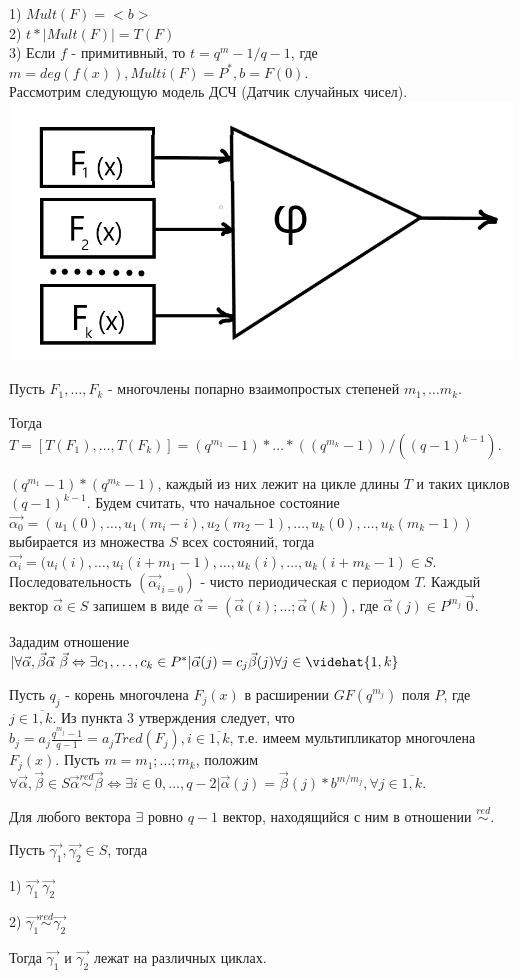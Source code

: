 	1) $Mult(F) = <b>$\\
	2) $t * |Mult(F)|=T(F)$\\
	3) Если $f$ - примитивный, то $t= {q^m - 1}/{q-1}$, где $m=deg(f(x)), Multi(F)=P^*, b=F(0)$.\\


Рассмотрим следующую модель ДСЧ (Датчик случайных чисел).\\

\includegraphics[scale=0.35]{DSC}

Пусть $F_1, \dots, F_k$ - многочлены попарно взаимопростых степеней $m_1, \dots m_k$.

Тогда $T=[T(F_1), \dots, T(F_k)] = (q^{m_1} - 1) * \dots * ((q^{m_k} - 1))/((q-1)^{k-1})$.

$(q^{m_1} - 1) * (q^{m_k} - 1)$, каждый из них лежит на цикле длины $T$ и таких циклов $(q-1)^{k-1}$. Будем считать, что начальное состояние $\vec{\alpha_0} = (u_1(0), \dots, u_1(m_i - i), u_2(m_2-1), \dots, u_k(0), \dots, u_k(m_k-1))$ выбирается из множества $S$ всех состояний, тогда $\vec{\alpha_i}=(u_i(i), \dots, u_i(i+m_1-1), \dots, u_k(i), \dots, u_k(i+m_k-1) \in S$.
 Последовательность $(\vec{\alpha_i}_{i=0})$ - чисто периодическая с периодом $T$.
Каждый вектор $\vec{\alpha} \in S$ запишем в виде $\vec{\alpha} = (\vec{\alpha}(i); \dots; \vec{\alpha}(k))$, где $\vec{\alpha}(j) \in P^{m_j} \ {\vec{0}}$.

Зададим отношение ~ $|\forall \vec{\alpha}, \vec{\beta} \vec{\alpha}~\vec{\beta} \Leftrightarrow \exists c_1, \dots, c_k \in P^*|\vec{\alpha}(j) = c_j \vec{\beta}(j) \forall j \in \videhat{1,k}$

Пусть $q_j$ - корень многочлена $F_j(x)$ в расширении $GF(q^{m_j})$ поля $P$, где $j \in \overline{1,k}$. Из пункта 3 утверждения следует, что $b_j = a_j \frac{q^{m_j}-1}{q-1} = a_j Tred(F_j), i \in \overline{1,k}$, т.е. имеем мультипликатор многочлена $F_j(x)$. Пусть $m=m_1; \dots; m_k$, положим $\forall \vec{\alpha}, \vec{\beta} \in S  \vec{\alpha} \stackrel{red}{\sim} \vec{\beta} \Leftrightarrow \exists i \in {0, \dots, q-2} | \vec{\alpha}(j) = \vec{\beta}(j) * b^{m/m_j}, \forall j \in \overline{1,k}$.

Для любого вектора $\exists$ ровно $q-1$ вектор, находящийся с ним в отношении $\stackrel{red}{\sim}$.

\thr
Пусть $\vec{\gamma_1}, \vec{\gamma_2} \in S$, тогда

1) $\vec{\gamma_1} ~ \vec{\gamma_2}$

2) $\vec{\gamma_1} \stackrel{red}{\sim} \vec{\gamma_2}$

Тогда $\vec{\gamma_1}$ и $\vec{\gamma_2}$ лежат на различных циклах.
